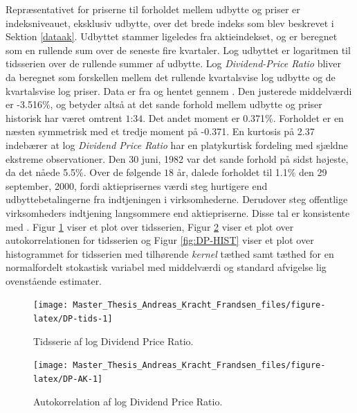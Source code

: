 \documentclass[
  a4paper,
  oneside]{memoir}
\begin{document}
Repræsentativet for priserne til forholdet mellem udbytte og priser er indeksniveauet, eksklusiv udbytte, over det brede indeks som blev beskrevet i Sektion \ref{dataak}. Udbyttet stammer ligeledes fra aktieindekset, og er beregnet som en rullende sum over de seneste fire kvartaler. Log udbyttet er logaritmen til tidsserien over de rullende summer af udbytte. Log \emph{Dividend-Price Ratio} bliver da beregnet som forskellen mellem det rullende kvartalsvise log udbytte og de kvartalsvise log priser. Data er fra \citep{CRSPakt} og hentet gennem \citep{WRDSakt}. Den justerede middelværdi er -3.516\(\%\), og betyder altså at det sande forhold mellem udbytte og priser historisk har været omtrent \(1\):\(34\). Det andet moment er 0.371\(\%\). Forholdet er en næsten symmetrisk med et tredje moment på -0.371. En kurtosis på 2.37 indebærer at log \emph{Dividend Price Ratio} har en platykurtisk fordeling med sjældne ekstreme observationer. Den 30 juni, 1982 var det sande forhold på sidst højeste, da det nåede 5.5\(\%\). Over de følgende \(18\) år, dalede forholdet til 1.1\(\%\) den 29 september, 2000, fordi aktieprisernes værdi steg hurtigere end udbyttebetalingerne fra indtjeningen i virksomhederne. Derudover steg offentlige virksomheders indtjening langsommere end aktiepriserne. Disse tal er konsistente med \citep{CampVic2003}. Figur \ref{fig:DP-tids} viser et plot over tidsserien, Figur \ref{fig:DP-AK} viser et plot over autokorrelationen for tidsserien og Figur \ref{fig:DP-HIST} viser et plot over histogrammet for tidsserien med tilhørende \emph{kernel} tæthed samt tæthed for en normalfordelt stokastisk variabel med middelværdi og standard afvigelse lig ovenstående estimater.

\begin{figure}[H]

{\centering \texttt{[image: Master\_Thesis\_Andreas\_Kracht\_Frandsen\_files/figure-latex/DP-tids-1]} 

}

\caption{Tidsserie af log Dividend Price Ratio.}\label{fig:DP-tids}
\end{figure}

\begin{figure}[H]

{\centering \texttt{[image: Master\_Thesis\_Andreas\_Kracht\_Frandsen\_files/figure-latex/DP-AK-1]} 

}

\caption{Autokorrelation af log Dividend Price Ratio.}\label{fig:DP-AK}
\end{figure}
\end{document}
